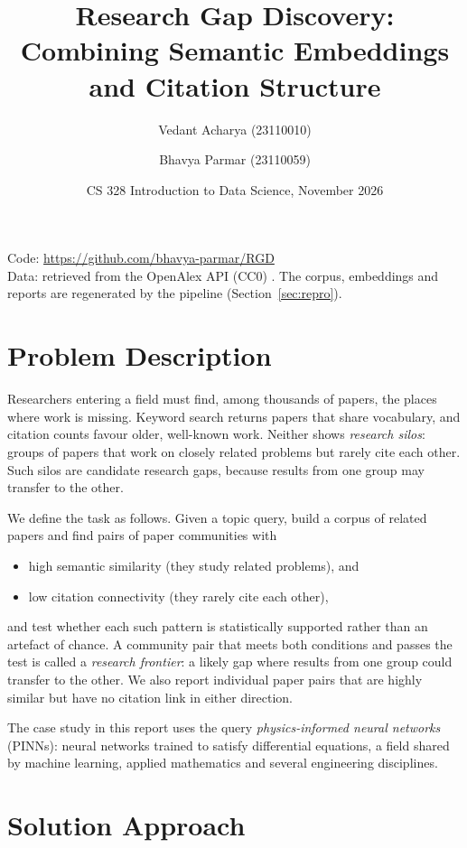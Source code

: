 \documentclass[11pt,a4paper]{article}
\title{Research Gap Discovery: Combining Semantic Embeddings and Citation Structure}
\author{Vedant Acharya (23110010) \and Bhavya Parmar (23110059)}
\date{CS 328 Introduction to Data Science, November 2026}
\begin{document}
\maketitle

\noindent Code: \url{https://github.com/bhavya-parmar/RGD}\\
Data: retrieved from the OpenAlex API (CC0) \cite{priem2022openalex}. The corpus, embeddings and reports are regenerated by the pipeline (Section~\ref{sec:repro}).

\section{Problem Description}
\label{sec:problem}

Researchers entering a field must find, among thousands of papers, the places where work is missing. Keyword search returns papers that share vocabulary, and citation counts favour older, well-known work. Neither shows \emph{research silos}: groups of papers that work on closely related problems but rarely cite each other. Such silos are candidate research gaps, because results from one group may transfer to the other.

We define the task as follows. Given a topic query, build a corpus of related papers and find pairs of paper communities with
\begin{itemize}
  \item high semantic similarity (they study related problems), and
  \item low citation connectivity (they rarely cite each other),
\end{itemize}
and test whether each such pattern is statistically supported rather than an artefact of chance. A community pair that meets both conditions and passes the test is called a \emph{research frontier}: a likely gap where results from one group could transfer to the other. We also report individual paper pairs that are highly similar but have no citation link in either direction.

The case study in this report uses the query \emph{physics-informed neural networks} (PINNs): neural networks trained to satisfy differential equations, a field shared by machine learning, applied mathematics and several engineering disciplines.

\section{Solution Approach}
\end{document}
